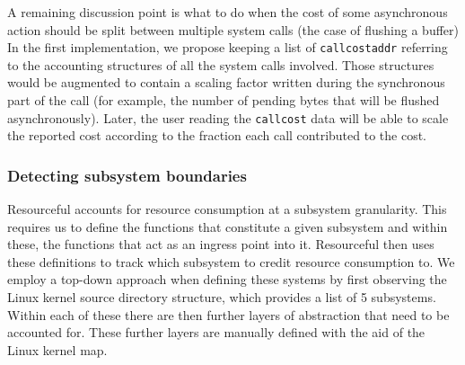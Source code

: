 \documentclass[12pt]{article}
\def\_{\textunderscore\-}
\begin{document}
  A remaining discussion point is what to do when the cost of some asynchronous action should be split between multiple system calls (the case of flushing a buffer) In the first implementation, we propose keeping a list of \texttt{call\_cost\_addr} referring to the accounting structures of all the system calls involved. Those structures would be augmented to contain a scaling factor written during the synchronous part of the call (for example, the number of pending bytes that will be flushed asynchronously). Later, the user reading the \texttt{call\_cost} data will be able to scale the reported cost according to the fraction each call contributed to the cost.

  \subsubsection{Detecting subsystem boundaries}
  Resourceful accounts for resource consumption at a subsystem granularity.
  This requires us to define the functions that constitute a given subsystem and within these, the functions that act as an ingress point into it.
  Resourceful then uses these definitions to track which subsystem to credit resource consumption to.
  We employ a top-down approach when defining these systems by first observing the Linux kernel source directory structure, which provides a list of 5 subsystems. Within each of these there are then further layers of abstraction that need to be accounted for. These further layers are manually defined with the aid of the Linux kernel map.
\end{document}
